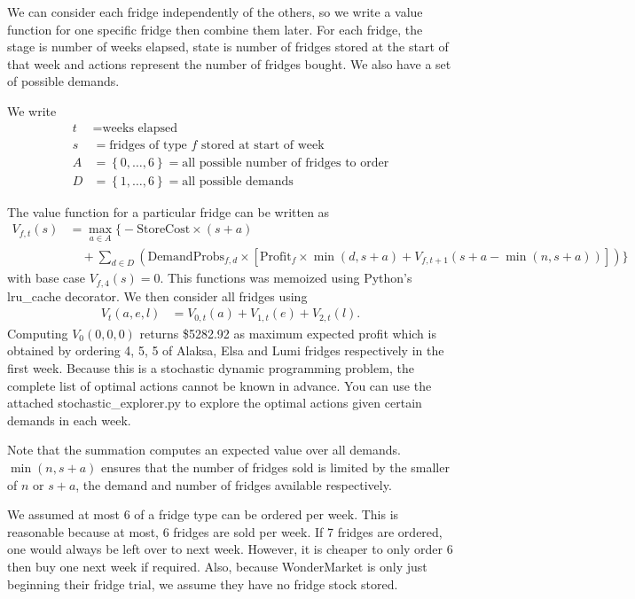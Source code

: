 \documentclass[11pt,a4paper]{article}
\begin{document}
We can consider each fridge independently of the others, so we write a value function 
for one specific fridge then combine them later. For each fridge, 
the stage is number of weeks elapsed, state is number of fridges stored at 
the start of that week and actions represent the number of fridges bought. We also 
have a set of possible demands.

We write 
\begin{align*}
    t &= \text{weeks elapsed} \\ 
    s &= \text{fridges of type $f$ stored at start of week} \\ 
    A &= \left\{ 0, \ldots, 6\right\} = \text{all possible number of fridges to order} \\ 
    D &= \left\{ 1, \ldots, 6\right\} = \text{all possible demands} 
\end{align*}

The value function for a particular fridge can be written as 
\begin{align*}
    V_{f,t}(s) &= \max_{a \in A} 
    \Big\{ -\mathrm{StoreCost}\times(s+a) \\ 
        & \quad + \sum_{d \in D} \left(\mathrm{DemandProbs}_{f,d} \times \left[\mathrm{Profit}_f\times\min(d, s+a)+  V_{f,t+1}(s+a-\min(n, s+a)) \right]\right)
        \Big\}
\end{align*}
with base case $V_{f,4}(s) = 0$. This functions was memoized using 
Python's lru\_cache decorator. We then consider all fridges using 
\begin{align*}
    V_t(a, e, l) &= V_{0,t}(a) + V_{1,t}(e) + V_{2,t}(l).
\end{align*}
Computing $V_0(0,0,0)$ returns \$5282.92 as maximum expected profit which is obtained by 
ordering 4, 5, 5 of Alaksa, Elsa and Lumi fridges respectively in the first week. Because this is 
a stochastic dynamic programming problem, the complete list of optimal actions
cannot be known in advance. You can use the attached stochastic\_explorer.py 
to explore the optimal actions given certain demands in each week.

Note that the summation computes an expected value over all demands.
$\min(n, s+a)$ ensures that the number of fridges sold is limited by the smaller 
of $n$ or $s+a$, the demand and number of fridges available respectively.

We assumed at most 6 of a fridge type can be ordered per week. This is reasonable 
because at most, 6 fridges are sold per week. If 7 fridges are ordered, one would always 
be left over to next week. However, it is cheaper to only order 6 then buy one 
next week if required. Also, because WonderMarket is only just beginning their 
fridge trial, we assume they have no fridge stock stored.
\end{document}
